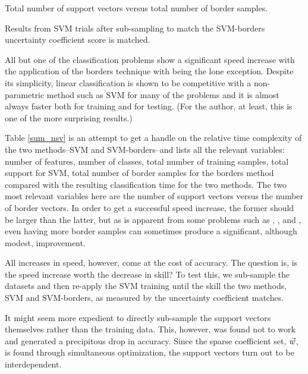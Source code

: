 \label{discussion}

\begin{table}
	\caption{Total number of support vectors versus total number of border samples.}
	
	\label{sum_nsv}
\end{table}

\begin{table}
  \caption{Results from SVM trials after sub-sampling to match the SVM-borders
	  uncertainty coefficient score is matched.}
  \label{subsampling_table}
  {\small
    
  }
\end{table}

All but one of the classification problems show a significant speed increase with the application
of the borders technique with  being the lone exception.
Despite its simplicity, linear classification is shown to be competitive with
a non-parametric method such as SVM for many of the problems and it is almost 
always faster both for training and for testing.
(For the author, at least, this is one of the more surprising results.)

Table \ref{sum_nsv} is an attempt to get a handle on the relative time complexity 
of the two methods--SVM and SVM-borders--and lists all the relevant variables: number of features,
number of classes, total number of training samples, total support for SVM,
total number of border samples for the borders method compared with the resulting
classification time for the two methods. The two most relevant variables here are the
number of support vectors versus the number of border vectors.
In order to get a successful speed increase, the former should be larger than 
the latter, but as is apparent from some problems such as , 
, and ,
even having more border samples can sometimes produce a significant,
although modest, improvement.

All increases in speed, however, come at the cost of accuracy.
The question is, is the speed increase worth the decrease in skill?
To test this, we sub-sample the datasets and then re-apply the SVM training
until the skill the two methods, SVM and SVM-borders, as measured by
the uncertainty coefficient matches.

It might seem more expedient to directly sub-sample the support vectors themselves
rather than the training data.
This, however, was found not to work and generated a precipitous drop in accuracy. 
Since the sparse coefficient set, $\vec {w}$, is found through simultaneous 
optimization, the support vectors turn out to be interdependent.

